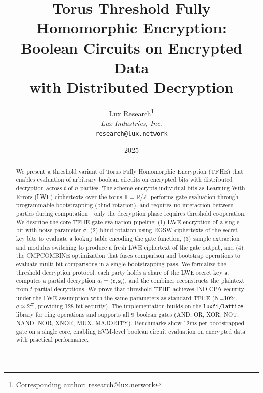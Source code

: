 \documentclass[11pt,a4paper]{article}
\title{\textbf{Torus Threshold Fully Homomorphic Encryption:\\Boolean Circuits on Encrypted Data\\with Distributed Decryption}}
\author{
Lux Research\thanks{Corresponding author: research@lux.network}\\
\textit{Lux Industries, Inc.}\\
\texttt{research@lux.network}
}
\date{2025}
\begin{document}
\luxcoverpage

\begin{abstract}
We present a threshold variant of Torus Fully Homomorphic Encryption (TFHE) that enables
evaluation of arbitrary boolean circuits on encrypted bits with distributed decryption
across $t$-of-$n$ parties. The scheme encrypts individual bits as Learning With Errors
(LWE) ciphertexts over the torus $\mathbb{T} = \mathbb{R}/\mathbb{Z}$, performs gate
evaluation through programmable bootstrapping (blind rotation), and requires no interaction
between parties during computation---only the decryption phase requires threshold
cooperation.
We describe the core TFHE gate evaluation pipeline: (1) LWE encryption of a single bit
with noise parameter $\sigma$, (2) blind rotation using RGSW ciphertexts of the secret
key bits to evaluate a lookup table encoding the gate function, (3) sample extraction
and modulus switching to produce a fresh LWE ciphertext of the gate output, and
(4) the CMPCOMBINE optimization that fuses comparison and bootstrap operations to evaluate
multi-bit comparisons in a single bootstrapping pass.
We formalize the threshold decryption protocol: each party holds a share of the LWE
secret key $\mathbf{s}$, computes a partial decryption $d_i = \langle \mathbf{c}, \mathbf{s}_i \rangle$,
and the combiner reconstructs the plaintext from $t$ partial decryptions. We prove that
threshold TFHE achieves IND-CPA security under the LWE assumption with the same parameters
as standard TFHE (N=1024, $q \approx 2^{27}$, providing 128-bit security).
The implementation builds on the \texttt{luxfi/lattice} library for ring operations
and supports all 9 boolean gates (AND, OR, XOR, NOT, NAND, NOR, XNOR, MUX, MAJORITY).
Benchmarks show 12ms per bootstrapped gate on a single core, enabling EVM-level boolean
circuit evaluation on encrypted data with practical performance.
\end{abstract}

\tableofcontents
\newpage










\end{document}
